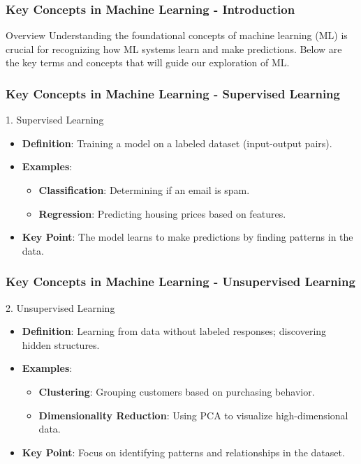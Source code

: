 \documentclass[aspectratio=169]{beamer}
\begin{document}
\begin{frame}[fragile]
    \frametitle{Key Concepts in Machine Learning - Introduction}
    \begin{block}{Overview}
        Understanding the foundational concepts of machine learning (ML) is crucial for recognizing how ML systems learn and make predictions. Below are the key terms and concepts that will guide our exploration of ML.
    \end{block}
\end{frame}

\begin{frame}[fragile]
    \frametitle{Key Concepts in Machine Learning - Supervised Learning}
    \begin{block}{1. Supervised Learning}
        \begin{itemize}
            \item \textbf{Definition}: Training a model on a labeled dataset (input-output pairs).
            \item \textbf{Examples}: 
            \begin{itemize}
                \item \textbf{Classification}: Determining if an email is spam.
                \item \textbf{Regression}: Predicting housing prices based on features.
            \end{itemize}
            \item \textbf{Key Point}: The model learns to make predictions by finding patterns in the data.
        \end{itemize}
    \end{block}
\end{frame}

\begin{frame}[fragile]
    \frametitle{Key Concepts in Machine Learning - Unsupervised Learning}
    \begin{block}{2. Unsupervised Learning}
        \begin{itemize}
            \item \textbf{Definition}: Learning from data without labeled responses; discovering hidden structures.
            \item \textbf{Examples}: 
            \begin{itemize}
                \item \textbf{Clustering}: Grouping customers based on purchasing behavior.
                \item \textbf{Dimensionality Reduction}: Using PCA to visualize high-dimensional data.
            \end{itemize}
            \item \textbf{Key Point}: Focus on identifying patterns and relationships in the dataset.
        \end{itemize}
    \end{block}
\end{frame}
\end{document}
